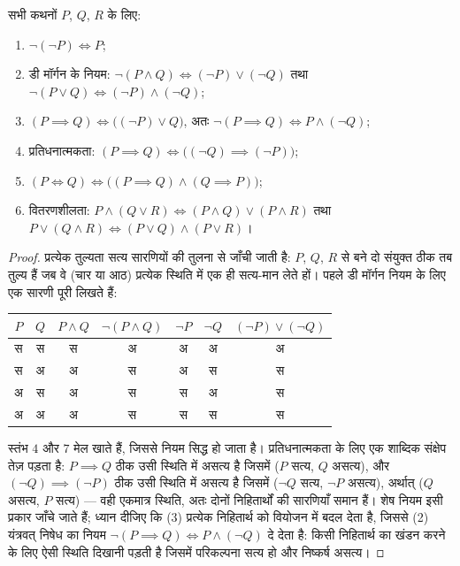 \begin{proposition}\label{prop:b1:logic:rules}
सभी कथनों $P$, $Q$, $R$ के लिए:
\begin{enumerate}
  \item $\lnot(\lnot P) \iff P$;
  \item डी मॉर्गन के नियम: $\lnot(P \land Q) \iff
  (\lnot P) \lor (\lnot Q)$ तथा $\lnot(P \lor Q) \iff (\lnot P) \land (\lnot
  Q)$;
  \item $(P \implies Q) \iff \bigl((\lnot P) \lor Q\bigr)$, अतः $\lnot(P
  \implies Q) \iff P \land (\lnot Q)$;
  \item प्रतिधनात्मकता: $(P \implies Q) \iff
  \bigl((\lnot Q) \implies (\lnot P)\bigr)$;
  \item $(P \iff Q) \iff \bigl((P \implies Q) \land (Q \implies
        P)\bigr)$;
  \item वितरणशीलता: $P \land (Q \lor R) \iff (P \land Q) \lor (P \land R)$
  तथा $P \lor (Q \land R) \iff (P \lor Q) \land (P \lor R)$।
\end{enumerate}
\end{proposition}

\begin{proof}
प्रत्येक तुल्यता सत्य सारणियों की तुलना से जाँची जाती है: $P$, $Q$, $R$ से
बने दो संयुक्त  ठीक तब तुल्य हैं जब वे (चार या आठ) प्रत्येक स्थिति में एक
ही सत्य-मान लेते हों। पहले डी मॉर्गन नियम के लिए एक सारणी पूरी लिखते हैं:
\begin{center}
\begin{tabular}{cc|c|c|cc|c}
$P$ & $Q$ & $P \land Q$ & $\lnot(P \land Q)$ & $\lnot P$ & $\lnot Q$ &
$(\lnot P) \lor (\lnot Q)$ \\ \hline स & स & स & अ & अ & अ & अ \\ स & अ & अ
& स & अ & स & स \\ अ & स & अ & स & स & अ & स \\ अ & अ & अ & स & स & स & स \\
\end{tabular}
\end{center}
स्तंभ $4$ और $7$ मेल खाते हैं, जिससे नियम सिद्ध हो जाता है। प्रतिधनात्मकता
के लिए एक शाब्दिक संक्षेप तेज़ पड़ता है: $P \implies Q$ ठीक उसी स्थिति में
असत्य है जिसमें ($P$ सत्य, $Q$ असत्य), और $(\lnot Q) \implies (\lnot P)$ ठीक
उसी स्थिति में असत्य है जिसमें ($\lnot Q$ सत्य, $\lnot P$ असत्य), अर्थात्
($Q$ असत्य, $P$ सत्य) --- वही एकमात्र स्थिति, अतः दोनों निहितार्थों की
सारणियाँ समान हैं। शेष नियम इसी प्रकार जाँचे जाते हैं; ध्यान दीजिए कि (3)
प्रत्येक निहितार्थ को वियोजन में बदल देता है, जिससे (2) यंत्रवत् निषेध का
नियम $\lnot(P \implies Q) \iff P \land (\lnot Q)$ दे देता है: किसी निहितार्थ
का खंडन करने के लिए ऐसी स्थिति दिखानी पड़ती है जिसमें परिकल्पना सत्य हो और
निष्कर्ष असत्य।
\end{proof}


